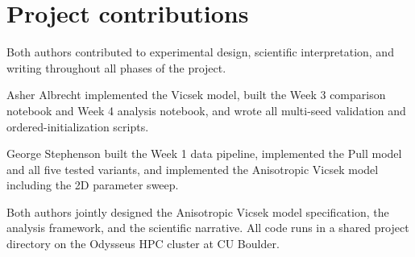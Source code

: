 \documentclass[11pt]{article}
\begin{document}
\section*{Project contributions}
Both authors contributed to experimental design, scientific interpretation, and writing throughout all phases of the project.

Asher Albrecht implemented the Vicsek model, built the Week 3 comparison notebook and Week 4 analysis notebook, and wrote all multi-seed validation and ordered-initialization scripts.

George Stephenson built the Week 1 data pipeline, implemented the Pull model and all five tested variants, and implemented the Anisotropic Vicsek model including the 2D parameter sweep.

Both authors jointly designed the Anisotropic Vicsek model specification, the analysis framework, and the scientific narrative. All code runs in a shared project directory on the Odysseus HPC cluster at CU Boulder.
\end{document}
